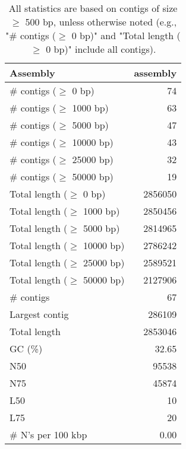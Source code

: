 \documentclass[12pt,a4paper]{article}
\begin{document}
\begin{table}[ht]
\begin{center}
\caption{All statistics are based on contigs of size $\geq$ 500 bp, unless otherwise noted (e.g., "\# contigs ($\geq$ 0 bp)" and "Total length ($\geq$ 0 bp)" include all contigs).}
\begin{tabular}{|l*{1}{|r}|}
\hline
Assembly & assembly \\ \hline
\# contigs ($\geq$ 0 bp) & 74 \\ \hline
\# contigs ($\geq$ 1000 bp) & 63 \\ \hline
\# contigs ($\geq$ 5000 bp) & 47 \\ \hline
\# contigs ($\geq$ 10000 bp) & 43 \\ \hline
\# contigs ($\geq$ 25000 bp) & 32 \\ \hline
\# contigs ($\geq$ 50000 bp) & 19 \\ \hline
Total length ($\geq$ 0 bp) & 2856050 \\ \hline
Total length ($\geq$ 1000 bp) & 2850456 \\ \hline
Total length ($\geq$ 5000 bp) & 2814965 \\ \hline
Total length ($\geq$ 10000 bp) & 2786242 \\ \hline
Total length ($\geq$ 25000 bp) & 2589521 \\ \hline
Total length ($\geq$ 50000 bp) & 2127906 \\ \hline
\# contigs & 67 \\ \hline
Largest contig & 286109 \\ \hline
Total length & 2853046 \\ \hline
GC (\%) & 32.65 \\ \hline
N50 & 95538 \\ \hline
N75 & 45874 \\ \hline
L50 & 10 \\ \hline
L75 & 20 \\ \hline
\# N's per 100 kbp & 0.00 \\ \hline
\end{tabular}
\end{center}
\end{table}
\end{document}
